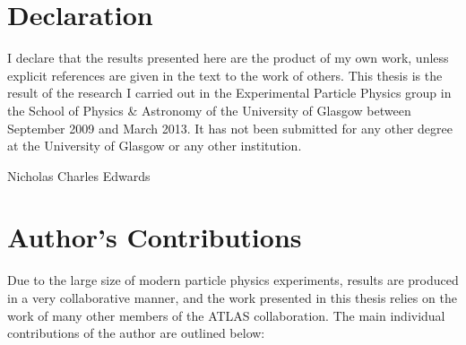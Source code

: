 \chapter*{Declaration}
I declare that the results presented here are the product of my own work, unless
explicit references are given in the text to the work of others. This thesis is
the result of the research I carried out in the Experimental Particle Physics
group in the School of Physics \& Astronomy of the University of Glasgow between
September 2009 and March 2013. It has not been submitted for any other degree
at the University of Glasgow or any other institution.

\hfill Nicholas Charles Edwards

\chapter*{Author's Contributions}

Due to the large size of modern particle physics experiments, results are produced in a very collaborative
manner, and the work presented in this thesis relies on the work of many other
members of the ATLAS collaboration.
The main individual contributions of the author are outlined below:

